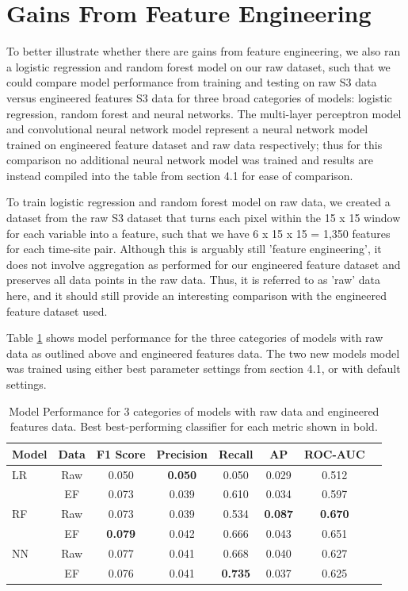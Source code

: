 \documentclass[a4paper,11pt]{report}
\begin{document}
\section{Gains From Feature Engineering}
\label{sec:Gains From Feature Engineering}

To better illustrate whether there are gains from feature engineering, we also ran a logistic regression and random forest model on our raw dataset, such that we could compare model performance from training and testing on raw S3 data versus engineered features S3 data for three broad categories of models: logistic regression, random forest and neural networks. The multi-layer perceptron model and convolutional neural network model represent a neural network model trained on engineered feature dataset and raw data respectively; thus for this comparison no additional neural network model was trained and results are instead compiled into the table from section 4.1 for ease of comparison.

To train logistic regression and random forest model on raw data, we created a dataset from the raw S3 dataset that turns each pixel within the 15 x 15 window for each variable into a feature, such that we have 6 x 15 x 15 = 1,350 features for each time-site pair. Although this is arguably still 'feature engineering', it does not involve aggregation as performed for our engineered feature dataset and preserves all data points in the raw data. Thus, it is referred to as 'raw' data here, and it should still provide an interesting comparison with the engineered feature dataset used.

Table \ref{tab:gains_from_feature_engineering} shows model performance for the three categories of models with raw data as outlined above and engineered features data. The two new models model was trained using either best parameter settings from section 4.1, or with default settings. 
    \begin{table}[h]
        \caption{Model Performance for 3 categories of models with raw data and engineered features data. Best best-performing classifier for each metric shown in bold.}
        \label{tab:gains_from_feature_engineering}
        \centering
        \begin{tabular}{lccccccc}
        \toprule
        \textbf{Model} & \textbf{Data} & \textbf{F1 Score} & \textbf{Precision} & \textbf{Recall} & \textbf{AP} & \textbf{ROC-AUC}  \\
        \midrule
        LR & Raw & 0.050 & \textbf{0.050} & 0.050 & 0.029 & 0.512  \\
         & EF & 0.073 & 0.039 & 0.610 & 0.034 & 0.597   \\ \midrule
        RF & Raw & 0.073 & 0.039 & 0.534 & \textbf{0.087} & \textbf{0.670}    \\
         & EF & \textbf{0.079} & 0.042 & 0.666 & 0.043 & 0.651  \\ \midrule
        NN & Raw & 0.077 & 0.041 & 0.668 & 0.040 & 0.627    \\
         & EF & 0.076 & 0.041 & \textbf{0.735} & 0.037 & 0.625    \\ \bottomrule
        \end{tabular}
    \end{table}
\end{document}
